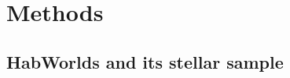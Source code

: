 \documentclass[
    usenatbib,
]{mnras}
\newcommand{\hwo}{HabWorlds}
\begin{document}

 

\section{Methods}


\subsection{\hwo{} and its stellar sample}
\label{subsec:2.1}
\end{document}
